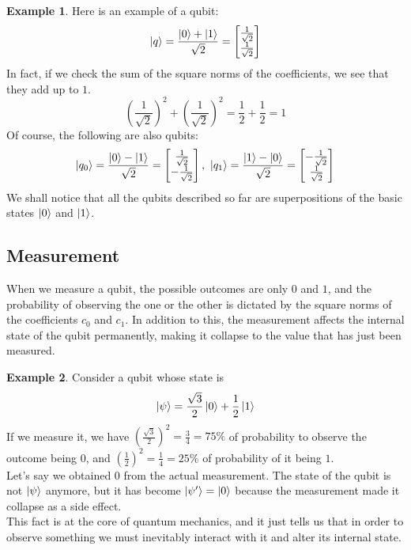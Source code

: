 \documentclass[12pt,a4paper]{report}
\theoremstyle{definition}
\theoremstyle{definition}
\newtheorem{example}{Example}[section]
\theoremstyle{definition}
\begin{document}
\begin{example}
Here is an example of a qubit:
\begin{equation*}
    \ket{q}=\frac{\ket{0}+\ket{1}}{\sqrt{2}}=\begin{bmatrix}
        \frac{1}{\sqrt{2}}\\
        \frac{1}{\sqrt{2}}
    \end{bmatrix}
\end{equation*}
In fact, if we check the sum of the square norms of the coefficients, we see that they add up to $1$.
\begin{equation*}
    \left(\frac{1}{\sqrt{2}}\right)^2+\left(\frac{1}{\sqrt{2}}\right)^2=\frac{1}{2}+\frac{1}{2}=1
\end{equation*}
Of course, the following are also qubits:
\begin{equation*}
    \ket{q_0}=\frac{\ket{0}-\ket{1}}{\sqrt{2}}=\begin{bmatrix}
        \frac{1}{\sqrt{2}}\\
        -\frac{1}{\sqrt{2}}
    \end{bmatrix},\ 
    \ket{q_1}=\frac{\ket{1}-\ket{0}}{\sqrt{2}}=\begin{bmatrix}
        -\frac{1}{\sqrt{2}}\\
        \frac{1}{\sqrt{2}}
    \end{bmatrix}
\end{equation*}
We shall notice that all the qubits described so far are superpositions of the basic states $\ket{0}$ and $\ket{1}$.
\end{example}



\subsection{Measurement}
When we measure a qubit, the possible outcomes are only $0$ and $1$, and the probability of observing the one or the other is dictated by the square norms of the coefficients $c_0$ and $c_1$. In addition to this, the measurement affects the internal state of the qubit permanently, making it collapse to the value that has just been measured.
\begin{example}
Consider a qubit whose state is
\begin{equation*}
    \ket{\psi}=\frac{\sqrt{3}}{2}\ket{0}+\frac{1}{2}\ket{1}
\end{equation*}
If we measure it, we have $\left(\frac{\sqrt{3}}{2}\right)^2=\frac{3}{4}=75\%$ of probability to observe the outcome being $0$, and $\left(\frac{1}{2}\right)^2=\frac{1}{4}=25\%$ of probability of it being $1$.\\
Let's say we obtained $0$ from the actual measurement. The state of the qubit is not $\ket{\psi}$ anymore, but it has become $\ket{\psi'}=\ket{0}$ because the measurement made it collapse as a side effect.\\
This fact is at the core of quantum mechanics, and it just tells us that in order to observe something we must inevitably interact with it and alter its internal state.
\end{example}
\end{document}
